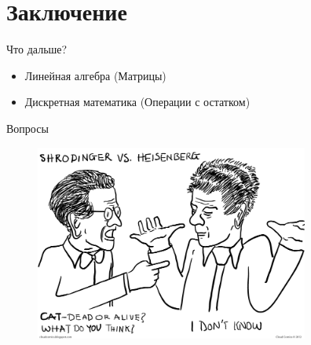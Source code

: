 \documentclass[10pt,pdf,hyperref={unicode}]{beamer}
\begin{document}
\section{Заключение}
\begin{frame}{Что дальше?}
\begin{itemize}
\item Линейная алгебра (Матрицы)
\item Дискретная математика (Операции с остатком)
\end{itemize}
\end{frame}

\begin{frame}{Вопросы}
 \begin{figure} 
   \includegraphics[width=90mm,scale=0.5]{questions.png}
  \end{figure}
\end{frame}
\end{document}
